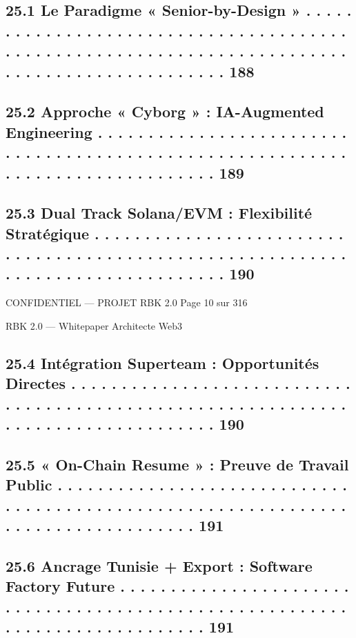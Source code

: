\subsection{25.1    Le Paradigme « Senior-by-Design » . . . . . . . . . . . . . . . . . . . . . . . . . . . . . . . . . . . . . . . . . . . . . . . . . . . . . . . . . . . . . . . . . . . . . . . . . . . . . . . . . . . . . . . . . . . . . . . 188}
\subsection{25.2    Approche « Cyborg » : IA-Augmented Engineering . . . . . . . . . . . . . . . . . . . . . . . . . . . . . . . . . . . . . . . . . . . . . . . . . . . . . . . . . . . . . . . . . . . . . . . . . . . . . . . . 189}
\subsection{25.3    Dual Track Solana/EVM : Flexibilité Stratégique . . . . . . . . . . . . . . . . . . . . . . . . . . . . . . . . . . . . . . . . . . . . . . . . . . . . . . . . . . . . . . . . . . . . . . . . . . . . . . . . . 190}
\vspace{0.5em}
\vspace{0.5em}
\begin{confidential}CONFIDENTIEL — PROJET RBK 2.0                                                                                  Page 10 sur 316\end{confidential}
RBK 2.0 — Whitepaper Architecte Web3\\
\vspace{0.5em}
\vspace{0.5em}
\subsection{25.4    Intégration Superteam : Opportunités Directes . . . . . . . . . . . . . . . . . . . . . . . . . . . . . . . . . . . . . . . . . . . . . . . . . . . . . . . . . . . . . . . . . . . . . . . . . . . . . . . . . . . 190}
\subsection{25.5    « On-Chain Resume » : Preuve de Travail Public . . . . . . . . . . . . . . . . . . . . . . . . . . . . . . . . . . . . . . . . . . . . . . . . . . . . . . . . . . . . . . . . . . . . . . . . . . . . . . . . . . 191}
\subsection{25.6    Ancrage Tunisie + Export : Software Factory Future . . . . . . . . . . . . . . . . . . . . . . . . . . . . . . . . . . . . . . . . . . . . . . . . . . . . . . . . . . . . . . . . . . . . . . . . . . . . . 191}

